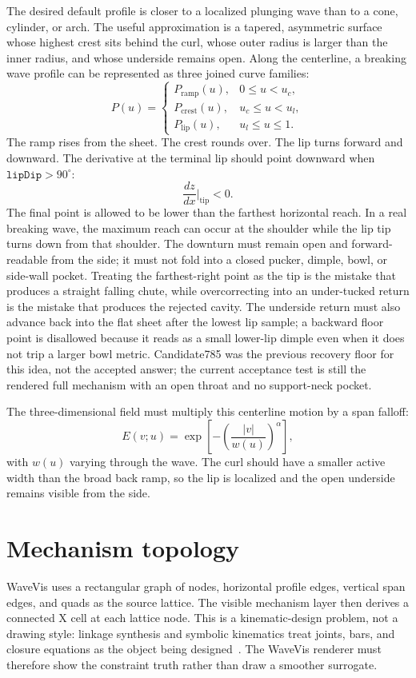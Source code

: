 \documentclass[12pt,letterpaper]{article}
\newcommand{\code}[1]{\texttt{#1}}
\begin{document}
The desired default profile is closer to a localized plunging wave than to a cone, cylinder, or arch. The useful approximation is a tapered, asymmetric surface whose highest crest sits behind the curl, whose outer radius is larger than the inner radius, and whose underside remains open. Along the centerline, a breaking wave profile can be represented as three joined curve families:
\[
  P(u)=
  \begin{cases}
    P_{\mathrm{ramp}}(u), & 0 \le u < u_c,\\
    P_{\mathrm{crest}}(u), & u_c \le u < u_l,\\
    P_{\mathrm{lip}}(u), & u_l \le u \le 1.
  \end{cases}
\]
The ramp rises from the sheet. The crest rounds over. The lip turns forward and downward. The derivative at the terminal lip should point downward when \(\code{lipDip}>90^\circ\):
\[
  \frac{dz}{dx}\bigg|_{\mathrm{tip}} < 0.
\]
The final point is allowed to be lower than the farthest horizontal reach. In a real breaking wave, the maximum reach can occur at the shoulder while the lip tip turns down from that shoulder. The downturn must remain open and forward-readable from the side; it must not fold into a closed pucker, dimple, bowl, or side-wall pocket. Treating the farthest-right point as the tip is the mistake that produces a straight falling chute, while overcorrecting into an under-tucked return is the mistake that produces the rejected cavity. The underside return must also advance back into the flat sheet after the lowest lip sample; a backward floor point is disallowed because it reads as a small lower-lip dimple even when it does not trip a larger bowl metric. Candidate785 was the previous recovery floor for this idea, not the accepted answer; the current acceptance test is still the rendered full mechanism with an open throat and no support-neck pocket.

The three-dimensional field must multiply this centerline motion by a span falloff:
\[
  E(v;u)=\exp\left[-\left(\frac{|v|}{w(u)}\right)^{\alpha}\right],
\]
with \(w(u)\) varying through the wave. The curl should have a smaller active width than the broad back ramp, so the lip is localized and the open underside remains visible from the side.

\section{Mechanism topology}

WaveVis uses a rectangular graph of nodes, horizontal profile edges, vertical span edges, and quads as the source lattice. The visible mechanism layer then derives a connected X cell at each lattice node. This is a kinematic-design problem, not a drawing style: linkage synthesis and symbolic kinematics treat joints, bars, and closure equations as the object being designed~\cite{hunt_kinematic_geometry_1978,mccarthy_linkages_2000,zhu_linkedit_2015}. The WaveVis renderer must therefore show the constraint truth rather than draw a smoother surrogate.
\end{document}
